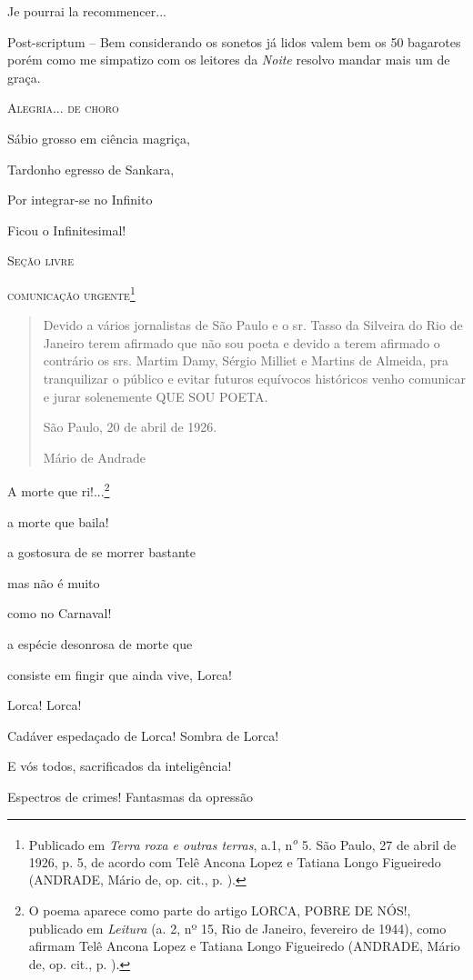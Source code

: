 Je pourrai la recommencer...

Post-scriptum -- Bem considerando os sonetos já lidos valem bem os 50
bagarotes porém como me simpatizo com os leitores da \emph{Noite}
resolvo mandar mais um de graça.

\textsc{Alegria... de choro}

Sábio grosso em ciência magriça,

Tardonho egresso de Sankara,

Por integrar-se no Infinito

Ficou o Infinitesimal!

\textsc{Seção livre}

\textsc{comunicação urgente}\footnote{Publicado em \emph{Terra roxa e
  outras terras}, a.1, n\textsuperscript{\emph{o}} 5. São Paulo, 27 de
  abril de 1926, p. 5, de acordo com Telê Ancona Lopez e Tatiana Longo
  Figueiredo (ANDRADE, Mário de, op. cit., p. ).}

\begin{quote}
Devido a vários jornalistas de São Paulo e o sr. Tasso da Silveira do
Rio de Janeiro terem afirmado que não sou poeta e devido a terem
afirmado o contrário os srs. Martim Damy, Sérgio Milliet e Martins de
Almeida, pra tranquilizar o público e evitar futuros equívocos
históricos venho comunicar e jurar solenemente QUE SOU POETA.

São Paulo, 20 de abril de 1926.

Mário de Andrade
\end{quote}

A morte que ri!...\footnote{O poema aparece como parte do artigo LORCA,
  POBRE DE NÓS!, publicado em \emph{Leitura} (a. 2, nº 15, Rio de
  Janeiro, fevereiro de 1944), como afirmam Telê Ancona Lopez e Tatiana
  Longo Figueiredo (ANDRADE, Mário de, op. cit., p. ).}

a morte que baila!

a gostosura de se morrer bastante

mas não é muito

como no Carnaval!

a espécie desonrosa de morte que

consiste em fingir que ainda vive, Lorca!

Lorca! Lorca!

Cadáver espedaçado de Lorca! Sombra de Lorca!

E vós todos, sacrificados da inteligência!

Espectros de crimes! Fantasmas da opressão

